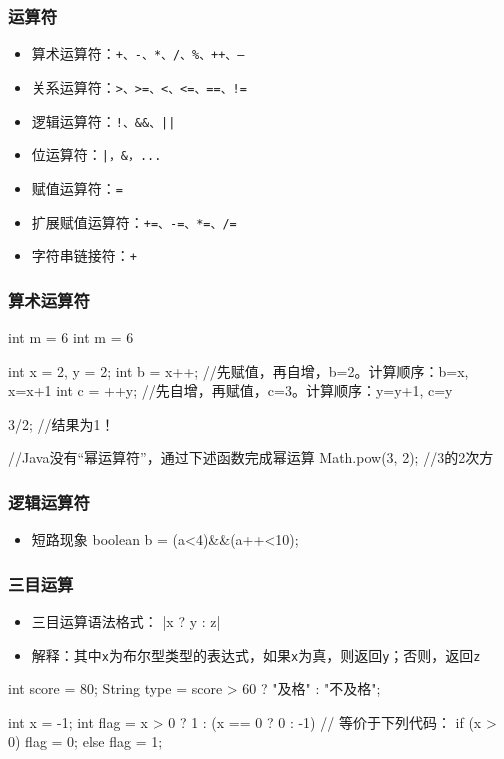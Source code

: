 \begin{frame}[fragile]
  \frametitle{运算符}
  \begin{itemize}
    \item 算术运算符：\texttt{+、-、*、/、\%、++、--}
    \item 关系运算符：\texttt{>、>=、<、<=、==、!=}
    \item 逻辑运算符：\texttt{!、\&\&、||}
    \item 位运算符：\texttt{|，\&，...}
    \item 赋值运算符：\texttt{=}
    \item 扩展赋值运算符：\texttt{+=、-=、*=、/=}
    \item 字符串链接符：\texttt{+}
  \end{itemize}
\end{frame}

\begin{frame}[fragile]
  \frametitle{算术运算符}
  \begin{javacode}
    int m = 6 %
    int m = 6 %
    
    int x = 2, y = 2;
    int b = x++; //先赋值，再自增，b=2。计算顺序：b=x, x=x+1
    int c = ++y; //先自增，再赋值，c=3。计算顺序：y=y+1, c=y
    
    3/2; //结果为1！
    
    //Java没有“幂运算符”，通过下述函数完成幂运算
    Math.pow(3, 2); //3的2次方
  \end{javacode}

\end{frame}

\begin{frame}
  \frametitle{逻辑运算符}
  \begin{itemize}
    \item 短路现象        boolean b = (a<4)&&(a++<10);

  \end{itemize}
\end{frame}

\begin{frame}[fragile]
  \frametitle{三目运算}
  \begin{itemize}
    \item 三目运算语法格式：
     \java|x ? y : z|
    \item 解释：其中\texttt{x}为布尔型类型的表达式，如果\texttt{x}为真，则返回\texttt{y}；否则，返回\texttt{z}
  \end{itemize}
  
  \begin{javacode}
  int score = 80;
  String type = score > 60 ? "及格" : "不及格"; 
  
  int x = -1;
  int flag =  x > 0 ? 1 : (x == 0 ? 0 : -1)
  // 等价于下列代码：
  if (x > 0) {
    flag = 0;
  } else {
    flag = 1;
  }
  \end{javacode}

\end{frame}

